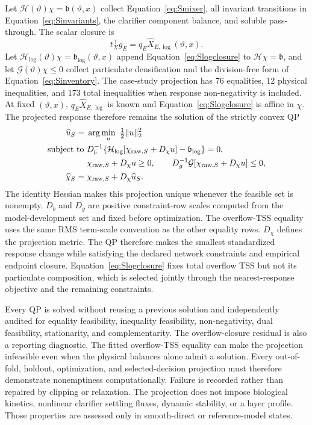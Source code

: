 \documentclass[a4paper,fleqn]{cas-sc}
\begin{document}
Let $\mathcal H(\vartheta)\chi=\mathfrak b(\vartheta,x)$ collect Equation~\eqref{eq:Smixer}, all invariant transitions in Equation~\eqref{eq:Sinvariants}, the clarifier component balance, and soluble pass-through. The scalar closure is
\begin{equation}
t_X^\top g_E=q_E\widehat X_{E,\log}(\vartheta,x).
\label{eq:Slogclosure}
\end{equation}
Let $\mathcal H_{\log}(\vartheta)\chi=\mathfrak b_{\log}(\vartheta,x)$ append Equation~\eqref{eq:Slogclosure} to $\mathcal H\chi=\mathfrak b$, and let $\mathcal G(\vartheta)\chi\le0$ collect particulate densification and the division-free form of Equation~\eqref{eq:Sinventory}. The case-study projection has 76 equalities, 12 physical inequalities, and 173 total inequalities when response non-negativity is included. At fixed $(\vartheta,x)$, $q_E\widehat X_{E,\log}$ is known and Equation~\eqref{eq:Slogclosure} is affine in $\chi$. The projected response therefore remains the solution of the strictly convex QP
\begin{align}
\widehat u_S={}&\arg\min_u\ \tfrac12\|u\|_2^2\notag\\
\text{subject to }&D_b^{-1}\{\mathcal H_{\log}[\chi_{{\rm raw},S}+D_\chi u]-\mathfrak b_{\log}\}=0,\notag\\
&\chi_{{\rm raw},S}+D_\chi u\ge0,\qquad
D_g^{-1}\mathcal G[\chi_{{\rm raw},S}+D_\chi u]\le0,\notag\\
\widehat\chi_S={}&\chi_{{\rm raw},S}+D_\chi\widehat u_S.
\label{eq:SQP}
\end{align}
The identity Hessian makes this projection unique whenever the feasible set is nonempty. $D_b$ and $D_g$ are positive constraint-row scales computed from the model-development set and fixed before optimization. The overflow-TSS equality uses the same RMS term-scale convention as the other equality rows. $D_\chi$ defines the projection metric. The QP therefore makes the smallest standardized response change while satisfying the declared network constraints and empirical endpoint closure. Equation~\eqref{eq:Slogclosure} fixes total overflow TSS but not its particulate composition, which is selected jointly through the nearest-response objective and the remaining constraints.

Every QP is solved without reusing a previous solution and independently audited for equality feasibility, inequality feasibility, non-negativity, dual feasibility, stationarity, and complementarity. The overflow-closure residual is also a reporting diagnostic. The fitted overflow-TSS equality can make the projection infeasible even when the physical balances alone admit a solution. Every out-of-fold, holdout, optimization, and selected-decision projection must therefore demonstrate nonemptiness computationally. Failure is recorded rather than repaired by clipping or relaxation. The projection does not impose biological kinetics, nonlinear clarifier settling fluxes, dynamic stability, or a layer profile. Those properties are assessed only in smooth-direct or reference-model states.
\end{document}
